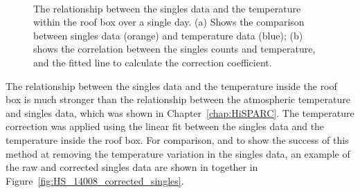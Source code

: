 \begin{figure}[ht!]
	\centering
	 \\
	
	\caption{The relationship between the singles data and the temperature within the roof box over a single day. (a) Shows the comparison between singles data (orange) and temperature data (blue); (b) shows the correlation between the singles counts and temperature, and the fitted line to calculate the correction coefficient.}
	\label{fig:14008_CR_V_T_corr}
\end{figure}

The relationship between the singles data and the temperature inside the roof box is much stronger than the relationship between the atmospheric temperature and singles data, which was shown in Chapter~\ref{chap:HiSPARC}. The temperature correction was applied using the linear fit between the singles data and the temperature inside the roof box. For comparison, and to show the success of this method at removing the temperature variation in the singles data, an example of the raw and corrected singles data are shown in together in Figure~\ref{fig:HS_14008_corrected_singles}. 

